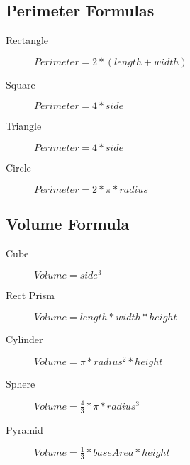 \documentclass[10pt, a4paper,twocolumn]{article}
\begin{document}
\subsection{Perimeter Formulas}
\begin{description}
    \item[Rectangle] 
        \begin{math}
            Perimeter = 2 *(length + width)
        \end{math}
    \item[Square] 
        \begin{math}
            Perimeter = 4 * side
        \end{math}
    \item[Triangle] 
        \begin{math}
            Perimeter = 4 * side
        \end{math}
    \item[Circle] 
        \begin{math}
            Perimeter = 2 * \pi * radius
        \end{math}
        
\end{description}

\subsection{Volume Formula}
\begin{description}
    \item[Cube] 
        \begin{math}
            Volume = side ^ 3
        \end{math}
    \item[Rect Prism] 
        \begin{math}
            Volume = length * width * height
        \end{math}
    \item[Cylinder] 
        \begin{math}
            Volume = \pi * radius ^2 *height
        \end{math}
    \item[Sphere] 
        \begin{math}
            Volume = \frac{4}{3}*\pi*radius^3
        \end{math}
    \item[Pyramid] 
        \begin{math}
            Volume = \frac{1}{3} *baseArea *height
        \end{math}
\end{description}
\end{document}
